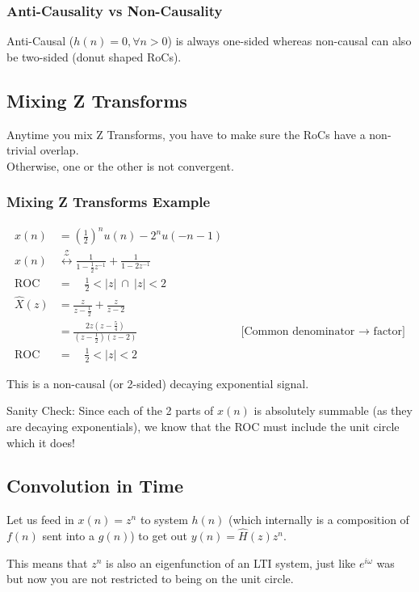 \subsubsection{Anti-Causality vs Non-Causality}
Anti-Causal ($h(n)=0,\forall n>0$) is always one-sided 
whereas non-causal can also be two-sided (donut shaped RoCs).

\subsection{ Mixing Z Transforms}
Anytime you mix Z Transforms, you have to make sure the RoCs have a non-trivial overlap.\\
Otherwise, one or the other is not convergent.

\subsubsection{Mixing Z Transforms Example}
\begin{align*}
    x(n)
    &=\left(\frac12\right)^n u(n) - 2^nu(-n-1)
    \\
    x(n)
    &\stackrel{\mathcal Z}\leftrightarrow
    \frac1{1-\frac12z^{-1}} + \frac1{1-2z^{-1}}
    \\
    \text{ROC}&=\quad\frac12<|z|\ \cap\ |z|<2
    \\
    \hat X(z)
    &=\frac z{z-\frac12} + \frac z{z-2}
    \\
    &=\frac{2z(z-\frac54)}{(z-\frac12)(z-2)}
    &&\text{[Common denominator $\to$ factor]}
    \\
    \text{ROC}&=\quad\frac12<|z|<2
\end{align*}

This is a non-causal (or 2-sided) decaying exponential signal.

\begin{shaded}
Sanity Check: Since each of the 2 parts of $x(n)$ is absolutely summable (as they are decaying exponentials), we know that the ROC must include the unit circle which it does!
\end{shaded}

\subsection{ Convolution in Time}
Let us feed in $x(n)=z^n$ to system $h(n)$ (which internally is a composition of $f(n)$ sent into a $g(n)$) to get out $y(n) =\hat H(z)z^n$.

This means that $z^n$ is also an eigenfunction of an LTI system, just like $e^{i\omega}$ was but now you are not restricted to being on the unit circle.

